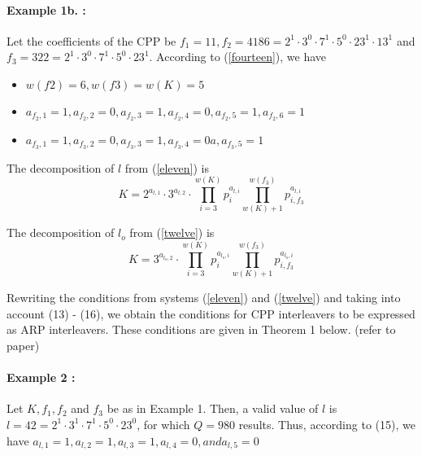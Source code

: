\documentclass[fontsize=12pt]{article}
\newcommand{\cd}{\cdot}
\begin{document}
\paragraph{Example 1b. : }
Let the coefficients of the CPP be $f_1=11, f_2 = 4186 =
2^1 \cd 3^0 \cd 7^1 \cd 5^0 \cd 23^1 \cd 13^1$ and $ f_3 = 322 = 2^1 \cd 3^0 \cd 7^1 \cd
5^0 \cd 23^1$. According to (\ref{fourteen}),
we have 
\begin{itemize}
\item$w( f2) = 6, w(f3) = w(K) = 5$
\item $ a_{f_2,1} = 1, a_{f_2,2} = 0, a_{f_2,3} = 1, a_{ f_2,4} = 0, a_{f_2,5} = 1, a_{f_2,6} = 1$
\item$a_{f_3,1} = 1, a_{f_3,2} = 0, a_{f_3,3} = 1, a_{f_3,4} = 0 a, a_{f_3,5} = 1$
\end{itemize}

The decomposition of $l$ from (\ref{eleven}) is 
\begin{equation}
 K =2^{a_{l,1}}\cdot 3^{a_{l,2}}\cdot \prod^{w(K)}_{i=3}p_i^{a_{l,i}}
 \prod^{w(f_3)}_{w(K)+1}p_{i,f_3}^{a_{l,i}}
\end{equation}

The decomposition of $l_o$ from (\ref{twelve}) is 
\begin{equation}
 K =3^{a_{l_o,2}}\cdot \prod^{w(K)}_{i=3}p_i^{a_{l_o,i}}
 \prod^{w(f_3)}_{w(K)+1}p_{i,f_3}^{a_{l_{o},i}}
\end{equation}

Rewriting the conditions from systems  (\ref{eleven}) and (\ref{twelve}) and
taking into account (13) - (16), we obtain the conditions for
CPP interleavers to be expressed as ARP interleavers. These
conditions are given in Theorem 1 below. (refer to paper)

\paragraph{Example 2 :} Let $K, f_1, f_2$ and $f_3$ be as in Example 1. Then,
a valid value of $l$ is $l = 42 = 2^1 \cdot 3^1 \cd 7^1 \cd 5^0 \cd 23^0$, for which $Q = 980$ results. Thus, according to (15), we have
$a_{l,1} = 1, a_{l,2} = 1, a_{l,3} = 1, a_{l,4} = 0, and a_{l,5} = 0$
\end{document}

